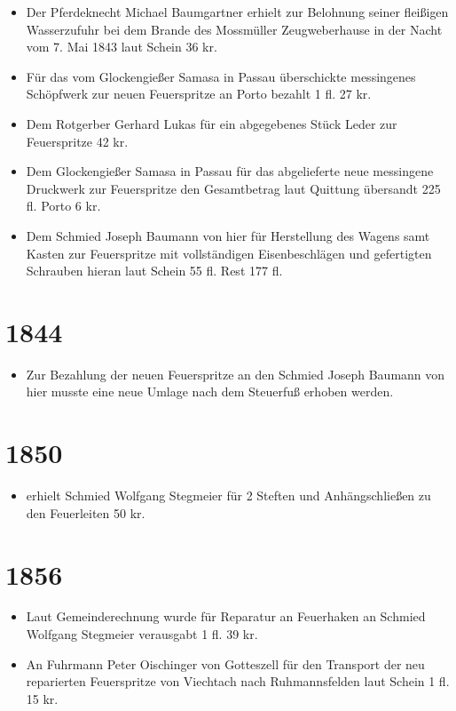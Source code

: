 \documentclass[12pt,a4paper]{book}
\begin{document}
\begin{itemize}
\item Der Pferdeknecht Michael Baumgartner erhielt zur Belohnung seiner
fleißigen Wasserzufuhr bei dem Brande des Mossmüller Zeugweberhause in der Nacht
vom 7. Mai 1843 laut Schein 36 kr.

\item Für das vom Glockengießer Samasa in Passau überschickte messingenes
Schöpfwerk zur neuen Feuerspritze an Porto bezahlt 1 fl. 27 kr.

\item Dem Rotgerber Gerhard Lukas für ein abgegebenes Stück Leder zur
Feuerspritze 42 kr.

\item Dem Glockengießer Samasa in Passau für das abgelieferte neue messingene
Druckwerk zur Feuerspritze den Gesamtbetrag laut Quittung übersandt 225 fl.
Porto 6 kr.

\item Dem Schmied Joseph Baumann von hier für Herstellung des Wagens samt Kasten
zur Feuerspritze mit vollständigen Eisenbeschlägen und gefertigten Schrauben
hieran laut Schein 55 fl. Rest 177 fl.
\end{itemize}

\section*{1844}

\begin{itemize}
\item Zur Bezahlung der neuen Feuerspritze an den Schmied Joseph Baumann von hier
musste eine neue Umlage nach dem Steuerfuß erhoben werden.
\end{itemize}

\section*{1850}

\begin{itemize}
\item erhielt Schmied Wolfgang Stegmeier für 2 Steften und Anhängschließen zu
den Feuerleiten 50 kr.
\end{itemize}

\section*{1856}

\begin{itemize}
\item Laut Gemeinderechnung wurde für Reparatur an Feuerhaken an Schmied
Wolfgang Stegmeier verausgabt 1 fl. 39 kr.

\item An Fuhrmann Peter Oischinger von Gotteszell für den Transport der neu
reparierten Feuerspritze von Viechtach nach Ruhmannsfelden laut Schein 1 fl. 15
kr.
\end{itemize}
\end{document}
